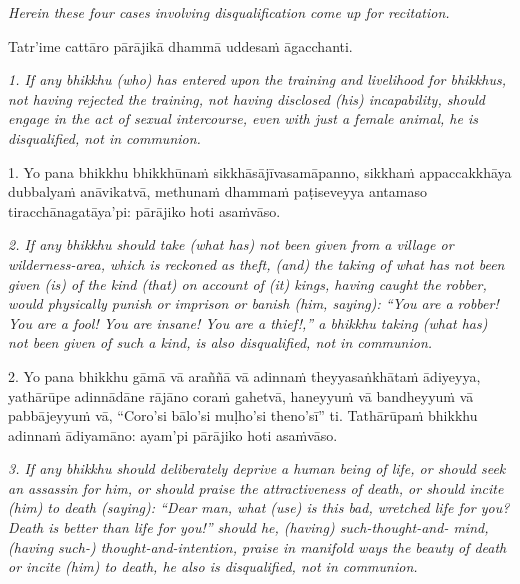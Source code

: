 \documentclass[11pt]{article}
\begin{document}
\begin{paracol}{2}
\begin{column}
{\itshape\footnotesize
Herein these four cases involving disqualification come up for recitation.
}
\switchcolumn

\begin{flushleft}
Tatr’ime cattāro pārājikā dhammā uddesaṁ āgacchanti.
\switchcolumn*
\end{flushleft}

{\itshape\footnotesize
1. If any bhikkhu (who) has entered upon the training and livelihood for bhikkhus, not having rejected the training, not having disclosed (his) incapability, should engage in the act of sexual intercourse, even with just a female animal, he is disqualified, not in communion.
}
\switchcolumn

\begin{flushleft}
1. Yo pana bhikkhu bhikkhūnaṁ sikkhāsājīvasamāpanno, sikkhaṁ appaccakkhāya dubbalyaṁ anāvikatvā, methunaṁ dhammaṁ paṭiseveyya antamaso tiracchānagatāya’pi: pārājiko hoti asaṁvāso.
\switchcolumn*
\end{flushleft}

{\itshape\footnotesize
2. If any bhikkhu should take (what has) not been given from a village or wilderness-area, which is reckoned as theft, (and) the taking of what has not been given (is) of the kind (that) on account of (it) kings, having caught the robber, would physically punish or imprison or banish (him, saying): “You are a robber! You are a fool! You are insane! You are a thief!,” a bhikkhu taking (what has) not been given of such a kind, is also disqualified, not in communion.
}
\switchcolumn

\begin{flushleft}
2. Yo pana bhikkhu gāmā vā araññā vā adinnaṁ theyyasaṅkhātaṁ ādiyeyya, yathārūpe adinnādāne rājāno coraṁ gahetvā, haneyyuṁ vā bandheyyuṁ vā pabbājeyyuṁ vā, “Coro’si bālo’si muḷho’si theno’sī” ti. Tathārūpaṁ bhikkhu adinnaṁ ādiyamāno: ayam’pi pārājiko hoti asaṁvāso.
\switchcolumn*
\end{flushleft}

{\itshape\footnotesize
3. If any bhikkhu should deliberately deprive a human being of life, or should seek an assassin for him, or should praise the attractiveness of death, or should incite (him) to death (saying): “Dear man, what (use) is this bad, wretched life for you? Death is better than life for you!” should he, (having) such-thought-and- mind, (having such-) thought-and-intention, praise in manifold ways the beauty of death or incite (him) to death, he also is disqualified, not in communion.
}
\switchcolumn


\end{column}
\end{paracol}
\end{document}
